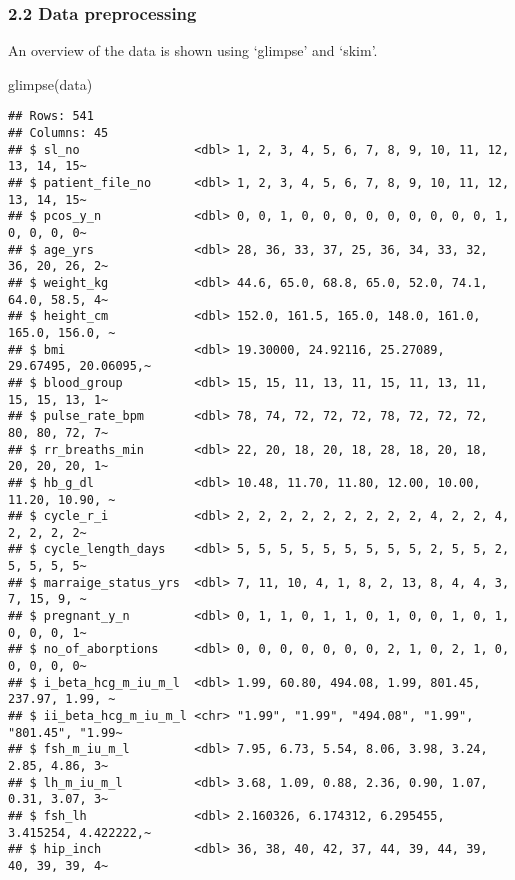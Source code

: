\documentclass[
]{article}
\newenvironment{Shaded}{\begin{snugshade}}{\end{snugshade}}
\newcommand{\FunctionTok}[1]{\textcolor[rgb]{0.00,0.00,0.00}{#1}}
\newcommand{\NormalTok}[1]{#1}
\begin{document}
\hypertarget{data-preprocessing}{%
\subsubsection{2.2 Data preprocessing}\label{data-preprocessing}}

An overview of the data is shown using `glimpse' and `skim'.

\begin{Shaded}
\begin{Highlighting}[]
\FunctionTok{glimpse}\NormalTok{(data)}
\end{Highlighting}
\end{Shaded}

\begin{verbatim}
## Rows: 541
## Columns: 45
## $ sl_no                <dbl> 1, 2, 3, 4, 5, 6, 7, 8, 9, 10, 11, 12, 13, 14, 15~
## $ patient_file_no      <dbl> 1, 2, 3, 4, 5, 6, 7, 8, 9, 10, 11, 12, 13, 14, 15~
## $ pcos_y_n             <dbl> 0, 0, 1, 0, 0, 0, 0, 0, 0, 0, 0, 0, 1, 0, 0, 0, 0~
## $ age_yrs              <dbl> 28, 36, 33, 37, 25, 36, 34, 33, 32, 36, 20, 26, 2~
## $ weight_kg            <dbl> 44.6, 65.0, 68.8, 65.0, 52.0, 74.1, 64.0, 58.5, 4~
## $ height_cm            <dbl> 152.0, 161.5, 165.0, 148.0, 161.0, 165.0, 156.0, ~
## $ bmi                  <dbl> 19.30000, 24.92116, 25.27089, 29.67495, 20.06095,~
## $ blood_group          <dbl> 15, 15, 11, 13, 11, 15, 11, 13, 11, 15, 15, 13, 1~
## $ pulse_rate_bpm       <dbl> 78, 74, 72, 72, 72, 78, 72, 72, 72, 80, 80, 72, 7~
## $ rr_breaths_min       <dbl> 22, 20, 18, 20, 18, 28, 18, 20, 18, 20, 20, 20, 1~
## $ hb_g_dl              <dbl> 10.48, 11.70, 11.80, 12.00, 10.00, 11.20, 10.90, ~
## $ cycle_r_i            <dbl> 2, 2, 2, 2, 2, 2, 2, 2, 2, 4, 2, 2, 4, 2, 2, 2, 2~
## $ cycle_length_days    <dbl> 5, 5, 5, 5, 5, 5, 5, 5, 5, 2, 5, 5, 2, 5, 5, 5, 5~
## $ marraige_status_yrs  <dbl> 7, 11, 10, 4, 1, 8, 2, 13, 8, 4, 4, 3, 7, 15, 9, ~
## $ pregnant_y_n         <dbl> 0, 1, 1, 0, 1, 1, 0, 1, 0, 0, 1, 0, 1, 0, 0, 0, 1~
## $ no_of_aborptions     <dbl> 0, 0, 0, 0, 0, 0, 0, 2, 1, 0, 2, 1, 0, 0, 0, 0, 0~
## $ i_beta_hcg_m_iu_m_l  <dbl> 1.99, 60.80, 494.08, 1.99, 801.45, 237.97, 1.99, ~
## $ ii_beta_hcg_m_iu_m_l <chr> "1.99", "1.99", "494.08", "1.99", "801.45", "1.99~
## $ fsh_m_iu_m_l         <dbl> 7.95, 6.73, 5.54, 8.06, 3.98, 3.24, 2.85, 4.86, 3~
## $ lh_m_iu_m_l          <dbl> 3.68, 1.09, 0.88, 2.36, 0.90, 1.07, 0.31, 3.07, 3~
## $ fsh_lh               <dbl> 2.160326, 6.174312, 6.295455, 3.415254, 4.422222,~
## $ hip_inch             <dbl> 36, 38, 40, 42, 37, 44, 39, 44, 39, 40, 39, 39, 4~

\end{verbatim}
\end{document}
